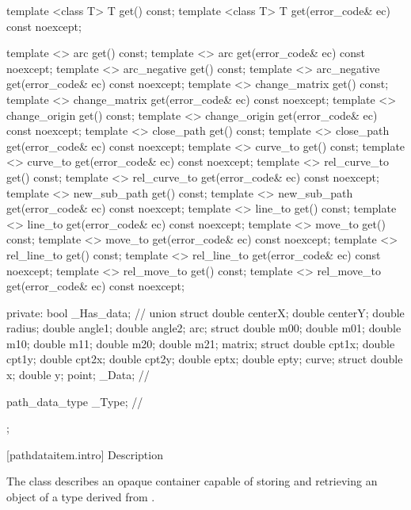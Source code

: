 \begin{codeblock}
{{{{{    template <class T>
    T get() const;
    template <class T>
    T get(error_code& ec) const noexcept;

    template <>
    arc get() const;
    template <>
    arc get(error_code& ec) const noexcept;
    template <>
    arc_negative get() const;
    template <>
    arc_negative get(error_code& ec) const noexcept;
    template <>
    change_matrix get() const;
    template <>
    change_matrix get(error_code& ec) const noexcept;
    template <>
    change_origin get() const;
    template <>
    change_origin get(error_code& ec) const noexcept;
    template <>
    close_path get() const;
    template <>
    close_path get(error_code& ec) const noexcept;
    template <>
    curve_to get() const;
    template <>
    curve_to get(error_code& ec) const noexcept;
    template <>
    rel_curve_to get() const;
    template <>
    rel_curve_to get(error_code& ec) const noexcept;
    template <>
    new_sub_path get() const;
    template <>
    new_sub_path get(error_code& ec) const noexcept;
    template <>
    line_to get() const;
    template <>
    line_to get(error_code& ec) const noexcept;
    template <>
    move_to get() const;
    template <>
    move_to get(error_code& ec) const noexcept;
    template <>
    rel_line_to get() const;
    template <>
    rel_line_to get(error_code& ec) const noexcept;
    template <>
    rel_move_to get() const;
    template <>
    rel_move_to get(error_code& ec) const noexcept;

  private:
    bool _Has_data;         // \expos
    union {
      struct {
        double centerX;
        double centerY;
        double radius;
        double angle1;
        double angle2;
      } arc;
      struct {
        double m00;
        double m01;
        double m10;
        double m11;
        double m20;
        double m21;
      } matrix;
      struct {
        double cpt1x;
        double cpt1y;
        double cpt2x;
        double cpt2y;
        double eptx;
        double epty;
      } curve;
      struct {
        double x;
        double y;
      } point;
    } _Data;               // \expos

    path_data_type _Type;  // \expos
  };
} } } }
\end{codeblock}

 [pathdataitem.intro] { Description}

\pnum
{}
The class  describes an opaque container capable of storing and retrieving an object of a type derived from .

